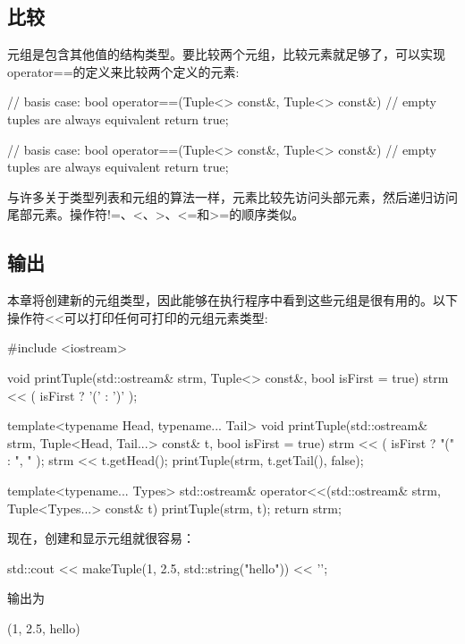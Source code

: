 


\subsection{比较}

元组是包含其他值的结构类型。要比较两个元组，比较元素就足够了，可以实现operator==的定义来比较两个定义的元素:

\begin{cpp}
// basis case:
bool operator==(Tuple<> const&, Tuple<> const&)
{
	// empty tuples are always equivalent
	return true;
}

// basis case:
bool operator==(Tuple<> const&, Tuple<> const&)
{
	// empty tuples are always equivalent
	return true;
}
\end{cpp}

与许多关于类型列表和元组的算法一样，元素比较先访问头部元素，然后递归访问尾部元素。操作符!=、<、>、<=和>=的顺序类似。

\subsection{输出}

本章将创建新的元组类型，因此能够在执行程序中看到这些元组是很有用的。以下操作符<{}<可以打印任何可打印的元组元素类型:

\begin{cpp}
#include <iostream>

void printTuple(std::ostream& strm, Tuple<> const&, bool isFirst = true)
{
	strm << ( isFirst ? ’(’ : ’)’ );
}

template<typename Head, typename... Tail>
void printTuple(std::ostream& strm, Tuple<Head, Tail...> const& t,
				bool isFirst = true)
{
	strm << ( isFirst ? "(" : ", " );
	strm << t.getHead();
	printTuple(strm, t.getTail(), false);
}

template<typename... Types>
std::ostream& operator<<(std::ostream& strm, Tuple<Types...> const& t)
{
	printTuple(strm, t);
	return strm;
}
\end{cpp}

现在，创建和显示元组就很容易：

\begin{cpp}
std::cout << makeTuple(1, 2.5, std::string("hello")) << ’\n’;
\end{cpp}

输出为

\begin{shell}
(1, 2.5, hello)
\end{shell}





















